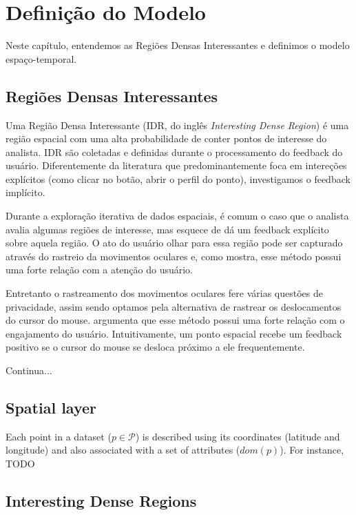 \chapter{Definição do Modelo}
\label{chap:modelo}

Neste capítulo, entendemos as Regiões Densas Interessantes e definimos o modelo espaço-temporal.

\section{Regiões Densas Interessantes}

Uma Região Densa Interessante (IDR, do inglês {\em Interesting Dense Region}) é uma região espacial com uma alta probabilidade de conter pontos de interesse do analista. IDR são coletadas e definidas durante o processamento do feedback do usuário. Diferentemente da literatura que predominantemente foca em intereções explícitos (como clicar no botão, abrir o perfil do ponto), investigamos o feedback implícito.

Durante a exploração iterativa de dados espaciais, é comum o caso que o analista avalia algumas regiões de interesse, mas esquece de dá um feedback explícito sobre aquela região. O ato do usuário olhar para essa região pode ser capturado através do rastreio da movimentos oculares e, como  mostra, esse método possui uma forte relação com a atenção do usuário.

Entretanto o rastreamento dos movimentos oculares fere várias questões de privacidade, assim sendo optamos pela alternativa de rastrear os deslocamentos do cursor do mouse.  argumenta que esse método possui uma forte relação com o engajamento do usuário. Intuitivamente, um ponto espacial recebe um feedback positivo se o cursor do mouse se desloca próximo a ele frequentemente.

Continua...

\section{Spatial layer}

Each point in a dataset ($p \in \mathcal{P}$) is described using its coordinates (latitude and longitude) and also associated with a set of attributes ($dom(p)$). For instance, TODO

\section{Interesting Dense Regions}

